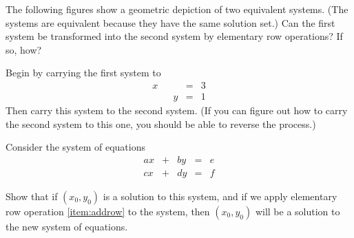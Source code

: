 \documentclass{ximera}
\begin{document}
\begin{problem}\label{prob:reverserowopsgeometry}
The following figures show a geometric depiction of two equivalent systems.  (The systems are equivalent because they have the same solution set.)  Can the first system be transformed into the second system by elementary row operations?  If so, how?

 \begin{center}
\quad\quad
{}
\end{center}


\begin{hint}
Begin by carrying the first system to 
$$\begin{array}{ccccc}
      x & &&= &3\\
      & &y&=&1      
    \end{array}$$
    Then carry this system to the second system.  (If you can figure out how to carry the second system to this one, you should be able to reverse the process.)
\end{hint}

\end{problem}

\begin{problem}\label{prob:equivsystems1}
Consider the system of equations
$$\begin{array}{ccccc}
      ax &+ &by&= &e\\
      cx&+ &dy&=&f      
    \end{array}$$

Show that  if  $(x_0,y_0)$ is a solution to this system, and if we apply elementary row operation \ref{item:addrow} to the system, then $(x_0,y_0)$ will be a solution to the new system of equations.
\end{problem}
\end{document}
